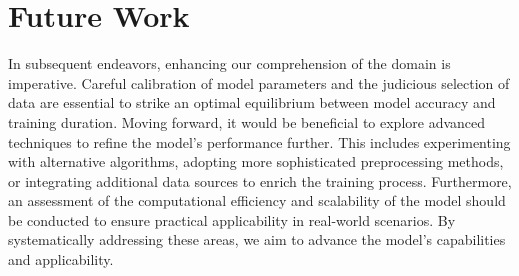 \section{Future Work}\label{Future Work}
In subsequent endeavors, enhancing our comprehension of the domain is imperative. Careful calibration of model parameters and the judicious selection of data are essential to strike an optimal equilibrium between model accuracy and training duration. Moving forward, it would be beneficial to explore advanced techniques to refine the model's performance further. This includes experimenting with alternative algorithms, adopting more sophisticated preprocessing methods, or integrating additional data sources to enrich the training process. Furthermore, an assessment of the computational efficiency and scalability of the model should be conducted to ensure practical applicability in real-world scenarios. By systematically addressing these areas, we aim to advance the model's capabilities and applicability.